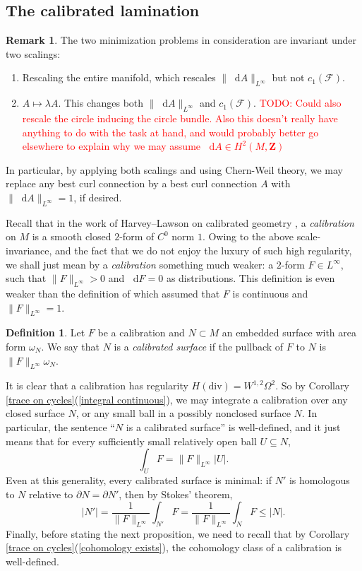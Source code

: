\documentclass[reqno,11pt]{amsart}
\newcommand{\ZZ}{\mathbf{Z}}
\newcommand*\dif{\mathop{}\!\mathrm{d}}
\newcommand{\dfn}[1]{\emph{#1}\index{#1}}
\theoremstyle{definition}
\newtheorem{definition}[theorem]{Definition}
\newtheorem{remark}[theorem]{Remark}
\numberwithin{equation}{section}
\newcommand\todo[1]{\textcolor{red}{TODO: #1}}
\begin{document}
\subsection{The calibrated lamination}
\begin{remark}\label{scalings}
The two minimization problems in consideration are invariant under two scalings: 
\begin{enumerate}
\item Rescaling the entire manifold, which rescales $\|\dif A\|_{L^\infty}$ but not $c_1(\mathscr F)$.
\item $A \mapsto \lambda A$. This changes both $\|\dif A\|_{L^\infty}$ and $c_1(\mathscr F)$. \todo{Could also rescale the circle inducing the circle bundle. Also this doesn't really have anything to do with the task at hand, and would probably better go elsewhere to explain why we may assume $\dif A \in H^2(M, \ZZ)$}
\end{enumerate}
In particular, by applying both scalings and using Chern-Weil theory, we may replace any best curl connection by a best curl connection $A$ with $\|\dif A\|_{L^\infty} = 1$, if desired.
\end{remark}

Recall that in the work of Harvey--Lawson on calibrated geometry \cite{Harvey82}, a \dfn{calibration} on $M$ is a smooth closed $2$-form of $C^0$ norm $1$.
Owing to the above scale-invariance, and the fact that we do not enjoy the luxury of such high regularity, we shall just mean by a \dfn{calibration} something much weaker: a $2$-form $F \in L^\infty$, such that $\|F\|_{L^\infty} > 0$ and $\dif F = 0$ as distributions.
This definition is even weaker than the definition of \cite[\S2A]{bangert_cui_2017} which assumed that $F$ is continuous and $\|F\|_{L^\infty} = 1$.

\begin{definition}
Let $F$ be a calibration and $N \subset M$ an embedded surface with area form $\omega_N$.
We say that $N$ is a \dfn{calibrated surface} if the pullback of $F$ to $N$ is $\|F\|_{L^\infty} \omega_N$.
\end{definition}

It is clear that a calibration has regularity $H(\text{div}) = W^{1, 2} \Omega^2$.
So by Corollary \ref{trace on cycles}(\ref{integral continuous}), we may integrate a calibration over any closed surface $N$, or any small ball in a possibly nonclosed surface $N$.
In particular, the sentence ``$N$ is a calibrated surface'' is well-defined, and it just means that for every sufficiently small relatively open ball $U \subseteq N$,
$$\int_U F = \|F\|_{L^\infty} |U|.$$
Even at this generality, every calibrated surface is minimal: if $N'$ is homologous to $N$ relative to $\partial N = \partial N'$, then by Stokes' theorem,
$$|N'| = \frac{1}{\|F\|_{L^\infty}} \int_{N'} F = \frac{1}{\|F\|_{L^\infty}} \int_N F \leq |N|.$$
Finally, before stating the next proposition, we need to recall that by Corollary \ref{trace on cycles}(\ref{cohomology exists}), the cohomology class of a calibration is well-defined.
\end{document}
